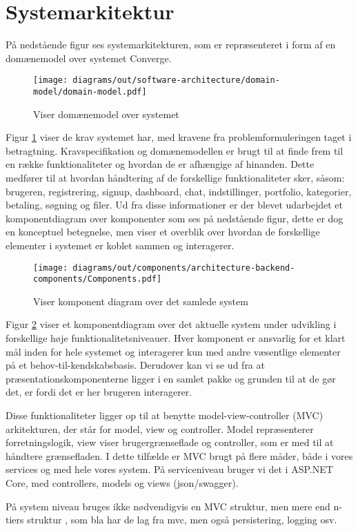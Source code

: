 
\section{Systemarkitektur}
På nedstående figur ses systemarkitekturen, som er repræsenteret i form af en domænemodel over systemet Converge.

\begin{figure}[H]
    \centering
\texttt{[image: diagrams/out/software-architecture/domain-model/domain-model.pdf]}
\caption{Viser domænemodel over systemet}
\label{fig:domainmodel}
\end{figure}

Figur \ref{fig:domainmodel} viser de krav systemet har, med kravene fra problemformuleringen taget i betragtning. Kravspecifikation og domænemodellen er brugt til at finde frem til en række funktionaliteter og hvordan de er afhængige af hinanden. Dette medfører til at hvordan håndtering af de forskellige funktionaliteter sker, såsom: brugeren, registrering, signup, dashboard, chat, indstillinger, portfolio, kategorier, betaling, søgning og filer. Ud fra disse informationer er der blevet udarbejdet et komponentdiagram over komponenter som ses på nedstående figur, dette er dog en konceptuel betegnelse, men viser et overblik over hvordan de forskellige elementer i systemet er koblet sammen og interagerer.

\begin{figure}[H]
    \centering
\texttt{[image: diagrams/out/components/architecture-backend-components/Components.pdf]}
\caption{Viser komponent diagram over det samlede system}
\label{fig:komponentdiagram}
\end{figure}


Figur \ref{fig:komponentdiagram} viser et komponentdiagram over det aktuelle system under udvikling i forskellige høje funktionalitetsniveauer. Hver komponent er ansvarlig for et klart mål inden for hele systemet og interagerer kun med andre væsentlige elementer på et behov-til-kendskabsbasis. Derudover kan vi se ud fra at præsentationskomponenterne ligger i en samlet pakke og grunden til at de gør det, er fordi det er her brugeren interagerer.

Disse funktionaliteter ligger op til at benytte model-view-controller (MVC) \cite[MVC]{converge-terms} arkitekturen, der står for model, view og controller. Model repræsenterer forretningslogik, view viser brugergrænseflade og controller, som er med til at håndtere grænsefladen. I dette tilfælde er MVC brugt på flere måder, både i vores services og med hele vores system. På serviceniveau bruger vi det i ASP.NET Core, med controllers, models og views (json/swagger). 

På system niveau bruges ikke nødvendigvis en MVC struktur, men mere end n-tiers struktur \cite[n-tiers struktur]{converge-terms}, som bla har de lag fra mvc, men også persistering, logging osv.




